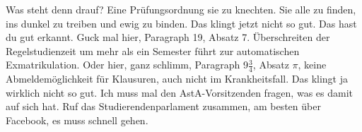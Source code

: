 \begin{verseplay}[10em]
\s{\Frodo} Was steht denn drauf?
\s{\Gandalf} 
					Eine Prüfungsordnung sie zu knechten.
					Sie alle zu finden,
					ins dunkel zu treiben
					und ewig zu binden.
\s{\Frodo} Das klingt jetzt nicht so gut.
\s{\Gandalf} Das hast du gut erkannt.
				Guck mal hier, Paragraph 19, Absatz 7. Überschreiten der Regelstudienzeit um mehr als ein Semester führt zur automatischen Exmatrikulation.
				Oder hier,  ganz schlimm, Paragraph 9$\tfrac34$, Absatz $\pi$, keine Abmeldemöglichkeit für Klausuren, auch nicht im Krankheitsfall.
\s{\Frodo} Das klingt ja wirklich nicht so gut.
\s{\Gandalf} Ich muss mal den AstA-Vorsitzenden \Saruman fragen, was es damit auf sich hat. Ruf das Studierendenparlament zusammen, am besten über Facebook, es muss schnell gehen.
			 
\end{verseplay}

